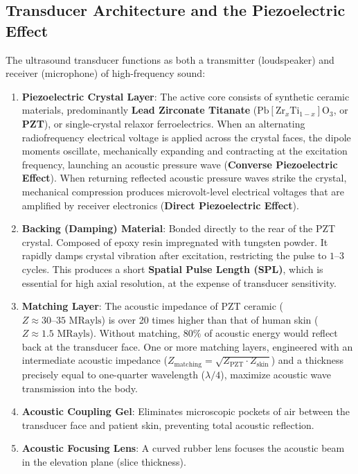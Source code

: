 \documentclass[11pt,a4paper]{article}
\begin{document}
\subsection{Transducer Architecture and the Piezoelectric Effect}
The ultrasound transducer functions as both a transmitter (loudspeaker) and receiver (microphone) of high-frequency sound:
\begin{enumerate}[leftmargin=*]
    \item \textbf{Piezoelectric Crystal Layer}: The active core consists of synthetic ceramic materials, predominantly \textbf{Lead Zirconate Titanate} ($\text{Pb}[\text{Zr}_x\text{Ti}_{1-x}]\text{O}_3$, or \textbf{PZT}), or single-crystal relaxor ferroelectrics. When an alternating radiofrequency electrical voltage is applied across the crystal faces, the dipole moments oscillate, mechanically expanding and contracting at the excitation frequency, launching an acoustic pressure wave (\textbf{Converse Piezoelectric Effect}). When returning reflected acoustic pressure waves strike the crystal, mechanical compression produces microvolt-level electrical voltages that are amplified by receiver electronics (\textbf{Direct Piezoelectric Effect}).
    \item \textbf{Backing (Damping) Material}: Bonded directly to the rear of the PZT crystal. Composed of epoxy resin impregnated with tungsten powder. It rapidly damps crystal vibration after excitation, restricting the pulse to $1\text{--}3$ cycles. This produces a short \textbf{Spatial Pulse Length (SPL)}, which is essential for high axial resolution, at the expense of transducer sensitivity.
    \item \textbf{Matching Layer}: The acoustic impedance of PZT ceramic ($Z \approx 30\text{--}35\text{ MRayls}$) is over 20 times higher than that of human skin ($Z \approx 1.5\text{ MRayls}$). Without matching, $80\%$ of acoustic energy would reflect back at the transducer face. One or more matching layers, engineered with an intermediate acoustic impedance ($Z_{\text{matching}} = \sqrt{Z_{\text{PZT}} \cdot Z_{\text{skin}}}$) and a thickness precisely equal to one-quarter wavelength ($\lambda/4$), maximize acoustic wave transmission into the body.
    \item \textbf{Acoustic Coupling Gel}: Eliminates microscopic pockets of air between the transducer face and patient skin, preventing total acoustic reflection.
    \item \textbf{Acoustic Focusing Lens}: A curved rubber lens focuses the acoustic beam in the elevation plane (slice thickness).
\end{enumerate}
\end{document}
